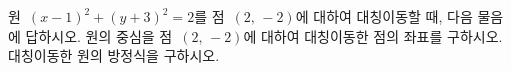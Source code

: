 원~$(x-1)^2+(y+3)^2=2$를 점~$(2,\,-2)$에 대하여 대칭이동할 때, 다음 물음에 답하시오.
 원의 중심을 점~$(2,\,-2)$에 대하여 대칭이동한 점의 좌표를 구하시오.
 대칭이동한 원의 방정식을 구하시오.

